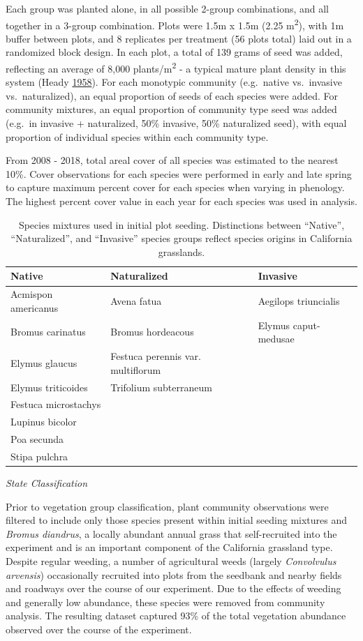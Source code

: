 \documentclass[twoside,12pt,final]{ucthesis-CA2012}
\begin{document}
\begin{ucmainmatter}
Each group was planted alone, in all possible 2-group combinations, and all together in a 3-group combination.
Plots were 1.5m x 1.5m (2.25 m\textsuperscript{2}), with 1m buffer between plots, and 8 replicates per treatment (56 plots total) laid out in a randomized block design.
In each plot, a total of 139 grams of seed was added, reflecting an average of 8,000 plants/m\textsuperscript{2} - a typical mature plant density in this system (Heady \protect\hyperlink{ref-Heady1958}{1958}).
For each monotypic community (e.g.~native vs.~invasive vs.~naturalized), an equal proportion of seeds of each species were added. For community mixtures, an equal proportion of community type seed was added (e.g.~in invasive + naturalized, 50\% invasive, 50\% naturalized seed), with equal proportion of individual species within each community type.

From 2008 - 2018, total areal cover of all species was estimated to the nearest 10\%. Cover observations for each species were performed in early and late spring to capture maximum percent cover for each species when varying in phenology. The highest percent cover value in each year for each species was used in analysis.
\begin{table}[ht]
\centering
\begin{tabular}{lll}
  \hline
Native & Naturalized & Invasive \\ 
  \hline
Acmispon americanus & Avena fatua & Aegilops triuncialis \\ 
  Bromus carinatus & Bromus hordeacous & Elymus caput-medusae \\ 
  Elymus glaucus & Festuca perennis var. multiflorum &  \\ 
  Elymus triticoides & Trifolium subterraneum &  \\ 
  Festuca microstachys &  &  \\ 
  Lupinus bicolor &  &  \\ 
  Poa secunda &  &  \\ 
  Stipa pulchra &  &  \\ 
   \hline
\end{tabular}
\caption{Species mixtures used in initial plot seeding. Distinctions between “Native”, “Naturalized”, and “Invasive” species groups reflect species origins in California grasslands.} 
\end{table}
\newline

\emph{State Classification}

Prior to vegetation group classification, plant community observations were filtered to include only those species present within initial seeding mixtures and \emph{Bromus diandrus}, a locally abundant annual grass that self-recruited into the experiment and is an important component of the California grassland type.
Despite regular weeding, a number of agricultural weeds (largely \emph{Convolvulus arvensis}) occasionally recruited into plots from the seedbank and nearby fields and roadways over the course of our experiment.
Due to the effects of weeding and generally low abundance, these species were removed from community analysis.
The resulting dataset captured 93\% of the total vegetation abundance observed over the course of the experiment.


\end{ucmainmatter}
\end{document}
